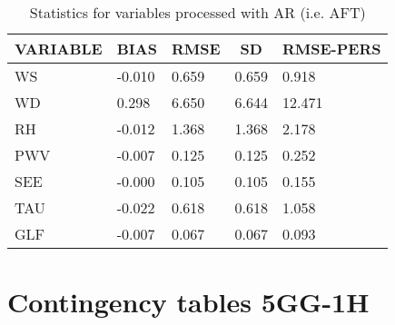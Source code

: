 \documentclass[11pt,english]{article}
\begin{document}
\begin{table}[]
\begin{center}
\begin{tabular}{|l|l|l|l|l|}
\hline
\multicolumn{1}{c|}{\cellcolor[HTML]{C0C0C0}\textbf{VARIABLE}} & \multicolumn{1}{c|}{\cellcolor[HTML]{C0C0C0}\textbf{BIAS}} & \multicolumn{1}{c|}{\cellcolor[HTML]{C0C0C0}\textbf{RMSE}} & \multicolumn{1}{c|}{\cellcolor[HTML]{C0C0C0}\textbf{SD}} & \multicolumn{1}{c|}{\cellcolor[HTML]{C0C0C0}\textbf{RMSE-PERS}}\\\hline
\cellcolor[HTML]{C0C0C0}WS  &    -0.010                                &     0.659                                &     0.659  &     0.918 \\
\cellcolor[HTML]{C0C0C0}WD  &     0.298                                &     6.650                                &     6.644  &    12.471 \\
\cellcolor[HTML]{C0C0C0}RH  &    -0.012                                &     1.368                                &     1.368  &     2.178 \\
\cellcolor[HTML]{C0C0C0}PWV &    -0.007                               &     0.125                               &     0.125 &     0.252 \\
\cellcolor[HTML]{C0C0C0}SEE &    -0.000                               &     0.105                               &     0.105 &     0.155 \\
\cellcolor[HTML]{C0C0C0}TAU &    -0.022                               &     0.618                               &     0.618 &     1.058 \\
\cellcolor[HTML]{C0C0C0}GLF &    -0.007                               &     0.067                               &     0.067 &     0.093 \\
\hline
\end{tabular}
\caption{Statistics for variables processed with AR (i.e. AFT)}
\end{center}
\end{table}
\clearpage
\section{Contingency tables 5GG-1H}
\end{document}
